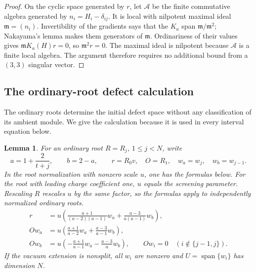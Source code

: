 \documentclass[11pt,a4paper]{article}
\numberwithin{equation}{section}
\newtheorem{lemma}[theorem]{Lemma}
\theoremstyle{definition}\newtheorem{definition}[theorem]{Definition}
\theoremstyle{remark}\newtheorem{remark}[theorem]{Remark}
\begin{document}
\begin{proof}
On the cyclic space generated by $r$, let $\mathcal A$ be the finite
commutative algebra generated by $n_i=H_i-\delta_{ij}$.  It is local
with nilpotent maximal ideal $\mathfrak m=(n_i)$.  Invertibility of
the gradients says that the $K_a$ span $\mathfrak m/\mathfrak m^2$;
Nakayama's lemma makes them generators of $\mathfrak m$.  Ordinariness
of their values gives $\mathfrak mK_a(H)r=0$, so
$\mathfrak m^2r=0$.  The maximal ideal is nilpotent because $\mathcal A$ is a finite
local algebra.  The argument therefore requires no additional bound
from a $(3,3)$ singular vector.
\end{proof}


\subsection{The ordinary-root defect calculation}

The ordinary roots determine the initial defect space without any
classification of its ambient module.  We give the calculation because
it is used in every interval equation below.

\begin{lemma}\label{neutral:lem:ordinary-root-defect}
For an ordinary root $R=R_j$, $1\leq j<N$, write
\[
 a=1+\frac2{t+j},\qquad b=2-a,\qquad
 r=R_0v,\quad O=R_1,\quad w_a=w_j,\quad w_b=w_{j-1}.
\]
In the root normalization with nonzero scale $u$, one has the formulas
below.  For the root with leading charge coefficient one, $u$ equals the
screening parameter.  Rescaling $R$ rescales $u$ by the same factor,
so the formulas apply to independently normalized ordinary roots.
\begin{align*}
 r&=u\left(\frac{a+1}{(a-2)(a-1)}w_a
                +\frac{a-3}{a(a-1)}w_b\right),\\
 Ow_a&=u\left(\frac{a+1}{a-2}w_a+
                         \frac{a-3}{a-1}w_b\right),\\
 Ow_b&=u\left(-\frac{a+1}{a-1}w_a-
                         \frac{a-3}{a}w_b\right),
 \qquad Ow_i=0\quad(i\notin\{j-1,j\}).
\end{align*}
If the vacuum extension is nonsplit, all $w_i$ are nonzero and
$U=\operatorname{span}\{w_i\}$ has dimension $N$.
\end{lemma}
\end{document}
